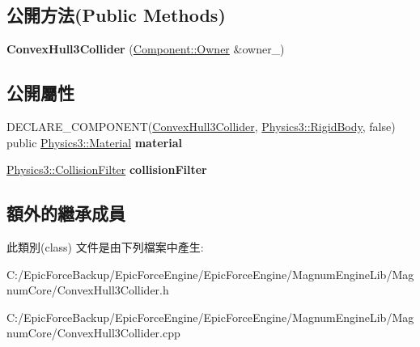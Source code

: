 \subsection*{公開方法(Public Methods)}
\begin{DoxyCompactItemize}
\item 
{\bfseries Convex\+Hull3\+Collider} (\hyperlink{class_magnum_1_1_component_1_1_owner}{Component\+::\+Owner} \&owner\+\_\+)\hypertarget{class_magnum_1_1_convex_hull3_collider_abf85df7f61c3ad59fb65e7bc5eca0447}{}\label{class_magnum_1_1_convex_hull3_collider_abf85df7f61c3ad59fb65e7bc5eca0447}

\end{DoxyCompactItemize}
\subsection*{公開屬性}
\begin{DoxyCompactItemize}
\item 
D\+E\+C\+L\+A\+R\+E\+\_\+\+C\+O\+M\+P\+O\+N\+E\+NT(\hyperlink{class_magnum_1_1_convex_hull3_collider}{Convex\+Hull3\+Collider}, \hyperlink{class_magnum_1_1_physics3_1_1_rigid_body}{Physics3\+::\+Rigid\+Body}, false) public \hyperlink{class_magnum_1_1_physics3_1_1_material}{Physics3\+::\+Material} {\bfseries material}\hypertarget{class_magnum_1_1_convex_hull3_collider_aa6a958920938b04d809d1521a24aa6c2}{}\label{class_magnum_1_1_convex_hull3_collider_aa6a958920938b04d809d1521a24aa6c2}

\item 
\hyperlink{class_magnum_1_1_physics3_1_1_collision_filter}{Physics3\+::\+Collision\+Filter} {\bfseries collision\+Filter}\hypertarget{class_magnum_1_1_convex_hull3_collider_a02da903dce8d574abf6241ff61fd9e90}{}\label{class_magnum_1_1_convex_hull3_collider_a02da903dce8d574abf6241ff61fd9e90}

\end{DoxyCompactItemize}
\subsection*{額外的繼承成員}


此類別(class) 文件是由下列檔案中產生\+:\begin{DoxyCompactItemize}
\item 
C\+:/\+Epic\+Force\+Backup/\+Epic\+Force\+Engine/\+Epic\+Force\+Engine/\+Magnum\+Engine\+Lib/\+Magnum\+Core/Convex\+Hull3\+Collider.\+h\item 
C\+:/\+Epic\+Force\+Backup/\+Epic\+Force\+Engine/\+Epic\+Force\+Engine/\+Magnum\+Engine\+Lib/\+Magnum\+Core/Convex\+Hull3\+Collider.\+cpp\end{DoxyCompactItemize}
